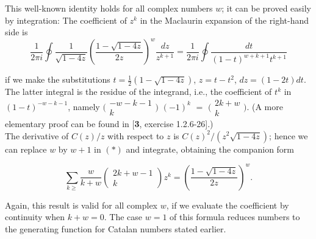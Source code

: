 \documentclass[10pt]{article}
\begin{document}
This well-known identity holds for all complex numbers $w$; it can be proved easily by integration: The 
coefficient of $z^{k}$ in the Maclaurin expansion of the right-hand side is  
\begin{equation*}
\frac{1}{2 \pi i}\oint \!  \frac{1}{ \sqrt{1 - 4z} } \left( \frac{1 - \sqrt{1-4z}}{2z} \right)^{w} \frac{dz}{z^{k+1}} = \frac{1}{2 \pi i } \oint \frac{dt} {(1-t)^{w+k+1}t^{k+1} }
\end{equation*}

if we make the substitutions $t = \frac{1}{2} \left( 1- \sqrt{1-4z} \right)$, $z=t-t^{2}$, $dz = (1-2t)dt$. 
The latter integral is the residue of the integrand, i.e., the coefficient of $t^{k}$ in $(1-t)^{-w-k-1}$, 
namely $\bigl( \begin{smallmatrix}
-w-k-1 \\ k
\end{smallmatrix} \bigr)$
$(-1)^{k}$
$=$
$\bigl( \begin{smallmatrix}
2k + w \\ k
\end{smallmatrix} \bigr)$.  (A more elementary proof can be found in [\textbf{3}, exercise 1.2.6-26].) \\
\indent The derivative of $C (z)/z$ with respect to $z$ is $C (z)^{2} / (z^{2} \sqrt{1 - 4z})$; 
hence we can replace $w$ by $w + 1$ in \label{eq:star2}$\boldsymbol{ (\ast) }$  and integrate, obtaining the companion form

\begin{equation*}
\sum_{k \geq} \frac{w}{k+w} \left( \begin{array}{c} 2k+w-1\\ k \end{array} \right) z^{k} = 
\left( \frac{1 - \sqrt{1-4z}}{2z} \right)^{w}.
\end{equation*}

\noindent Again, this result is valid for all complex $w$, if we evaluate the coefficient by continuity when  $k + w = 0$. The case $w = 1$ of this formula reduces numbers to the generating function for Catalan numbers stated earlier.
\end{document}

